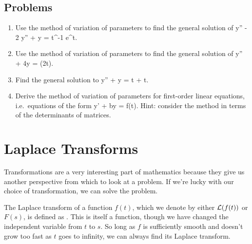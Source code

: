 \documentclass[12pt]{article}
\begin{document}
\subsection{Problems}

\begin{enumerate}

\item Use the method of variation of parameters to find the general solution of
  \bee
  y'' - 2 y'' + y = t^{-1} e^t.
  \eee

\item Use the method of variation of parameters to find the general solution of
  \bee
  y'' + 4y = \sin(2t).
  \eee

\item
  Find the general solution to
  \bee
  y'' + y = \tan t + t.
  \eee

\item
  Derive the method of variation of parameters for first-order linear
  equations, i.e.\ equations of the form
  \bee
  y' + by = f(t).
  \eee
  Hint: consider the method in terms of the determinants of matrices.

\end{enumerate}

\newpage
\section{Laplace Transforms}

Transformations are a very interesting part of mathematics because they give us
another perspective from which to look at a problem. If we're lucky with
our choice of transformation, we can solve the problem.

The Laplace transform of a function $f(t)$, which we denote by either
$\mathcal{L}(f(t))$ or $F(s)$, is defined as
\be
{}.
\ee
This is itself a function, though we have changed the independent variable
from $t$ to $s$. So long as $f$ is sufficiently smooth and doesn't grow too
fast as $t$ goes to infinity, we can always find its Laplace transform.\\
\end{document}
